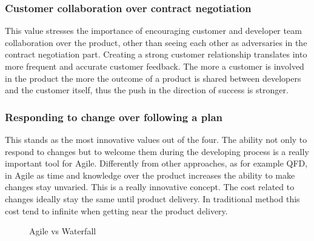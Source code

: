 \documentclass[../main.tex]{subfiles}
\begin{document}
\subsubsection{Customer collaboration over contract negotiation}
This value stresses the importance of encouraging customer and developer team collaboration over the product, other than seeing each other as adversaries in the contract negotiation part.
Creating a strong customer relationship translates into more frequent and accurate customer feedback. The more a customer is involved in the product the more the outcome of a product is shared between developers and the customer itself, thus the push in the direction of success is stronger.  
\subsubsection{Responding to change over following a plan}
This stands as the most innovative values out of the four. The ability not only to respond to changes but to welcome them during the developing process is a really important tool for Agile. Differently from other approaches, as for example QFD, in Agile as time and knowledge over the product increases the ability to make changes stay unvaried. This is a really innovative concept. The cost related to changes ideally stay the same until product delivery. In traditional method this cost tend to infinite when getting near the product delivery.
\begin{figure}[H]
\centering
{}
\caption{Agile vs Waterfall}
    \label{fig:agilevswaterfall}
\end{figure}
\end{document}
